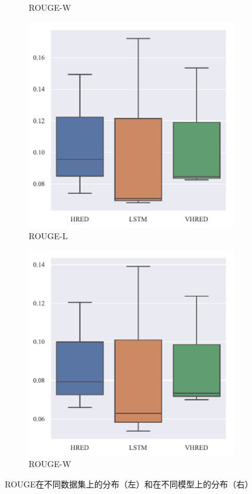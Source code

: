 \begin{figure}[H]
\begin{subfigure}{0.25\linewidth}
        \caption{ROUGE-W}
    \end{subfigure}%
    \begin{subfigure}{0.25\linewidth}
        \centering
        \includegraphics[width=\linewidth]{figure/boxplot/model/rouge_l/plot.pdf}
        \caption{ROUGE-L}
    \end{subfigure}%
    \begin{subfigure}{0.25\linewidth}
        \centering
        \includegraphics[width=\linewidth]{figure/boxplot/model/rouge_w/plot.pdf}
        \caption{ROUGE-W}
    \end{subfigure}
    \centering
    \caption{ROUGE在不同数据集上的分布（左）和在不同模型上的分布（右）}
    \label{fig:ROUGE_dataset}
\end{figure}

